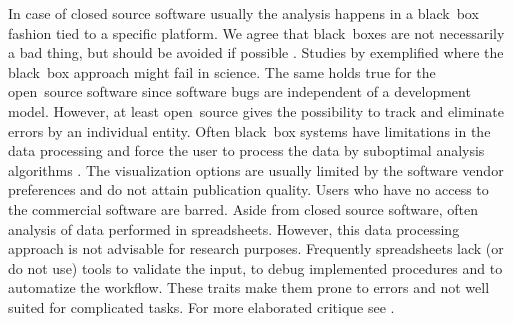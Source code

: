 In case of closed source software usually the analysis happens in a black~box 
fashion tied to a specific platform. We agree that black~boxes are not 
necessarily a bad thing, but should be avoided if possible 
\citep{roediger_RJ_2013, Spiess_2014}. Studies by \citet{mccullough_2008, 
Almiron_2010, Duran_2014} exemplified where the black~box approach might fail in 
science. The same holds true for the open~source software since software 
bugs are independent of a development model. However, at least open~source gives 
the possibility to track and eliminate  errors by an individual entity. Often 
black~box systems have limitations in the data processing and force the user to 
process the data by suboptimal analysis algorithms \citep{ruijter_2013}. The 
visualization options are usually limited by the software vendor preferences and 
do not attain publication quality. Users who have no access to the commercial 
software are barred. Aside from closed source software, often analysis of data 
performed in spreadsheets. However, this data processing approach is not 
advisable for research purposes. Frequently spreadsheets  lack (or do not use) 
tools to validate the input, to debug implemented procedures and to automatize 
the workflow. These traits make them prone to errors and not well suited for 
complicated tasks. For more elaborated critique see \citet{mccullough_2008, 
burns_2014}.

